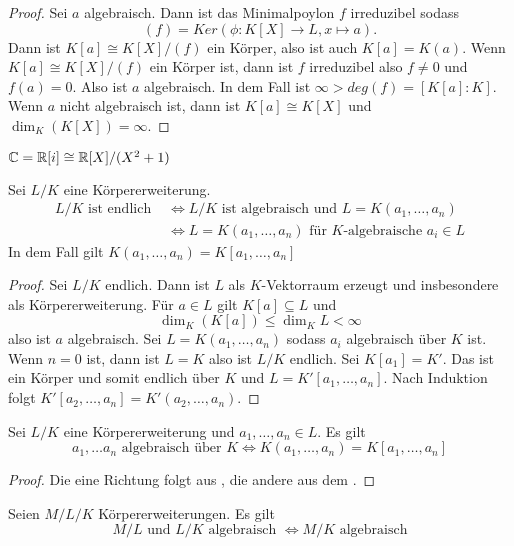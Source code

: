 \begin{proof}
    Sei \(a\) algebraisch. Dann ist das Minimalpoylon \(f\) irreduzibel sodass 
        \[(f)=Ker(\phi\colon K[X]\to L, x\mapsto a).\] Dann ist \(K[a]\cong K[X]/(f)\) ein Körper, also ist auch \(K[a]=K(a)\). 
        Wenn \(K[a]\cong K[X]/(f)\) ein Körper ist, dann ist \(f\) irreduzibel also \(f\neq 0\) und \(f(a)=0\). Also ist \(a\) algebraisch.
        In dem Fall ist \(\infty>deg(f)=[K[a]:K]\).
        Wenn \(a\) nicht algebraisch ist, dann ist \(K[a]\cong K[X]\) und \(\dim_K(K[X])=\infty.\)
\end{proof}
\begin{Bsp}
    \(\mathbb{C}=\mathbb{R}[i]\cong \mathbb{R}[X]/(X^2+1)\)
\end{Bsp}
\begin{Satz}\label{Satz:EndlAlg}
    Sei \(L/K\) eine Körpererweiterung.
    \begin{align*}
        L/K\text{ ist endlich } &\iff L/K\text{ ist algebraisch und } L=K(a_1,\dots,a_n)\\
        &\iff L=K(a_1,\dots,a_n) \text{ für \(K\)-algebraische \(a_i\in L\)}
    \end{align*}
    In dem Fall gilt \(K(a_1,\dots,a_n)=K[a_1,\dots,a_n]\)
\end{Satz}
\begin{proof}
    Sei \(L/K\) endlich. Dann ist \(L\) als \(K\)-Vektorraum erzeugt und insbesondere als Körpererweiterung. Für \(a\in L\) gilt \(K[a]\subseteq L\) und \[\dim_K(K[a])\leq\dim_KL<\infty\] also ist \(a\) algebraisch.
    Sei \(L=K(a_1,\dots,a_n)\) sodass \(a_i\) algebraisch über \(K\) ist.
    Wenn \(n=0\) ist, dann ist \(L=K\) also ist \(L/K\) endlich.
    Sei \(K[a_1]=K'\). Das ist ein Körper und somit endlich über \(K\) und \(L=K'[a_1,\dots,a_n]\). Nach Induktion folgt \(K'[a_2,\dots,a_n]=K'(a_2,\dots,a_n)\).
\end{proof}
\begin{Kor} Sei \(L/K\) eine Körpererweiterung und \(a_1,\dots,a_n\in L\). Es gilt
    \[a_1,\dots a_n \text{ algebraisch über }K \iff K(a_1,\dots,a_n)=K[a_1,\dots,a_n]\]
\end{Kor}
\begin{proof}
    Die eine Richtung folgt aus , die andere aus dem .
\end{proof}
\begin{Kor}
    Seien \(M/L/K\) Körpererweiterungen. Es gilt \[M/L \text{ und }L/K \text{ algebraisch }\iff M/K\text{ algebraisch}\]
\end{Kor}
